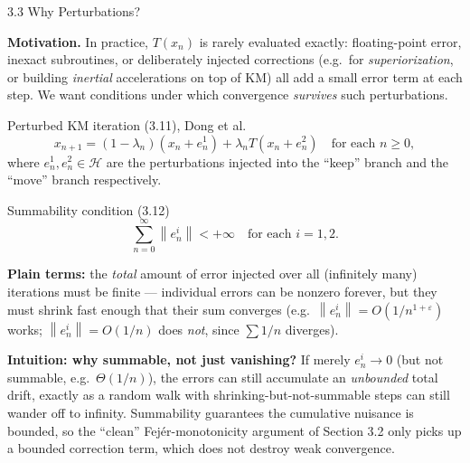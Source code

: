 \documentclass[aspectratio=169,10pt]{beamer}
\newcommand{\cH}{\mathcal{H}}
\newcommand{\norm}[1]{\left\|#1\right\|}
\begin{document}
\begin{frame}[allowframebreaks]{3.3 Why Perturbations?}

  \textbf{Motivation.} In practice, $T(x_n)$ is rarely evaluated
  exactly: floating-point error, inexact subroutines, or deliberately
  injected corrections (e.g.\ for \emph{superiorization}, or building
  \emph{inertial} accelerations on top of KM) all add a small error term
  at each step. We want conditions under which convergence
  \emph{survives} such perturbations.

  \begin{block}{Perturbed KM iteration (3.11), Dong et al.}
    $$x_{n+1}=(1-\lambda_n)(x_n+e_n^1)+\lambda_n T(x_n+e_n^2)
      \quad\text{for each } n\ge0,$$
    where $e_n^1,e_n^2\in\cH$ are the perturbations injected into the
    ``keep'' branch and the ``move'' branch respectively.
  \end{block}

  \begin{block}{Summability condition (3.12)}
    $$\sum_{n=0}^{\infty}\norm{e_n^i}<+\infty \quad\text{for each } i=1,2.$$
  \end{block}
  \textbf{Plain terms:} the \emph{total} amount of error injected over
  all (infinitely many) iterations must be finite --- individual errors
  can be nonzero forever, but they must shrink fast enough that their
  sum converges (e.g.\ $\norm{e_n^i}=O(1/n^{1+\varepsilon})$ works;
  $\norm{e_n^i}=O(1/n)$ does \emph{not}, since $\sum 1/n$ diverges).

  \framebreak

  \textbf{Intuition: why summable, not just vanishing?} If merely
  $e_n^i\to0$ (but not summable, e.g.\ $\Theta(1/n)$), the errors can
  still accumulate an \emph{unbounded} total drift, exactly as a random
  walk with shrinking-but-not-summable steps can still wander off to
  infinity. Summability guarantees the cumulative nuisance is bounded,
  so the ``clean'' Fej\'er-monotonicity argument of Section 3.2 only
  picks up a bounded correction term, which does not destroy weak
  convergence.
\end{frame}
\end{document}
